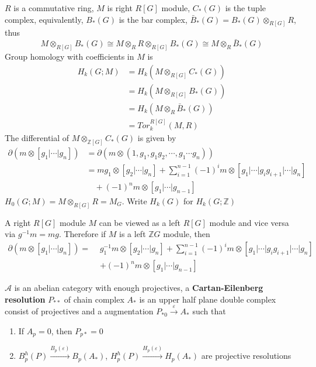 \documentclass[../main.tex]{subfiles}
\begin{document}
\begin{definition}
$R$ is a commutative ring, $M$ is right $R[G]$ module, $C_*(G)$ is the tuple complex, equivalently, $B_*(G)$ is the bar complex, $\bar B_*(G)=B_*(G)\otimes_{R[G]}R$, thus
\[M\otimes_{R[G]}B_*(G)\cong M\otimes_{R}R\otimes_{R[G]}B_*(G)\cong M\otimes_R\bar B_*(G)\]
Group homology with coefficients in $M$ is
\begin{align*}
H_k(G;M)&=H_k(M\otimes_{R[G]}C_*(G)) \\
&=H_k(M\otimes_{R[G]}B_*(G)) \\
&=H_k(M\otimes_{R}\bar B_*(G)) \\
&=Tor_k^{R[G]}(M,R)
\end{align*}
The differential of $M\otimes_{\mathbb Z[G]} C_*(G)$ is given by
\begin{align*}
\partial(m\otimes[g_1|\cdots|g_n])&=\partial(m\otimes(1,g_1,g_1g_2,\cdots,g_1\cdots g_n)) \\
&=mg_1\otimes[g_2|\cdots|g_n]+\sum_{i=1}^{n-1}(-1)^im\otimes[g_1|\cdots|g_ig_{i+1}|\cdots|g_n] \\
&\quad+(-1)^nm\otimes[g_1|\cdots|g_{n-1}]
\end{align*}
$H_0(G;M)=M\otimes_{R[G]}R=M_G$. Write $H_k(G)$ for $H_k(G;\mathbb Z)$
\end{definition}

\begin{remark}
A right $R[G]$ module $M$ can be viewed as a left $R[G]$ module and vice versa via $g^{-1}m=mg$. Therefore if $M$ is a left $\mathbb ZG$ module, then
\begin{align*}
\partial(m\otimes[g_1|\cdots|g_n])=\,\,&g_1^{-1}m\otimes[g_2|\cdots|g_n]+\sum_{i=1}^{n-1}(-1)^im\otimes[g_1|\cdots|g_ig_{i+1}|\cdots|g_n] \\
&+(-1)^nm\otimes[g_1|\cdots|g_{n-1}]
\end{align*}
\end{remark}

\begin{definition}
$\mathcal A$ is an abelian category with enough projectives, a \textbf{Cartan-Eilenberg resolution} $P_{**}$ of chain complex $A_*$ is an upper half plane double complex consist of projectives and a augmentation $P_{*0}\xrightarrow\varepsilon A_*$ such that
\begin{enumerate}[label=\arabic*., leftmargin=*]
\item If $A_p=0$, then $P_{p*}=0$
\item $B^h_p(P)\xrightarrow{B_p(\varepsilon)} B_p(A_*)$, $H^h_p(P)\xrightarrow{H_p(\varepsilon)} H_p(A_*)$ are projective resolutions
\end{enumerate}
\end{definition}
\end{document}
